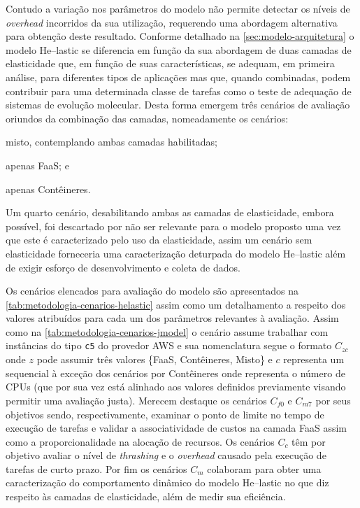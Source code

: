 \documentclass[english,brazilian]{UNISINOSmonografia} %
\begin{document}
Contudo a variação nos parâmetros do modelo não permite detectar os níveis de \textit{overhead} incorridos da sua utilização, requerendo uma abordagem alternativa para obtenção deste resultado.
Conforme detalhado na \autoref{sec:modelo-arquitetura} o modelo \textsf{He}--lastic se diferencia em função da sua abordagem de duas camadas de elasticidade que, em função de suas características, se adequam, em primeira análise, para diferentes tipos de aplicações mas que, quando combinadas, podem contribuir para uma determinada classe de tarefas como o teste de adequação de sistemas de evolução molecular.
Desta forma emergem três cenários de avaliação oriundos da combinação das camadas, nomeadamente os cenários: 
\begin{inparaenum}[\itshape 1\upshape)] 
	\item misto, contemplando ambas camadas habilitadas;  
	\item apenas FaaS; e
	\item apenas Contêineres.
\end{inparaenum}
Um quarto cenário, desabilitando ambas as camadas de elasticidade, embora possível, foi descartado por não ser relevante para o modelo proposto uma vez que este é caracterizado pelo uso da elasticidade, assim um cenário sem elasticidade forneceria uma caracterização deturpada do modelo \textsf{He}--lastic além de exigir esforço de desenvolvimento e coleta de dados.


Os cenários elencados para avaliação do modelo são apresentados na \autoref{tab:metodologia-cenarios-helastic} assim como um detalhamento a respeito dos valores atribuídos para cada um dos parâmetros relevantes à avaliação.
Assim como na \autoref{tab:metodologia-cenarios-jmodel} o cenário assume trabalhar com instâncias do tipo \texttt{c5} do provedor AWS e sua nomenclatura segue o formato $C_{zc}$ onde $z$ pode assumir três valores \{FaaS, Contêineres, Misto\} e $c$ representa um sequencial à exceção dos cenários por Contêineres onde representa o número de CPUs (que por sua vez está alinhado aos valores definidos previamente visando permitir uma avaliação justa).
Merecem destaque os cenários $C_{f0}$ e $C_{m7}$ por seus objetivos sendo, respectivamente, examinar o ponto de limite no tempo de execução de tarefas e validar a associatividade de custos na camada FaaS assim como a proporcionalidade na alocação de recursos.
Os cenários $C_{c}$ têm por objetivo avaliar o nível de \textit{thrashing} e o \textit{overhead} causado pela execução de tarefas de curto prazo.
Por fim os cenários $C_{m}$ colaboram para obter uma caracterização do comportamento dinâmico do modelo \textsf{He}--lastic no que diz respeito às camadas de elasticidade, além de medir sua eficiência.
\end{document}
